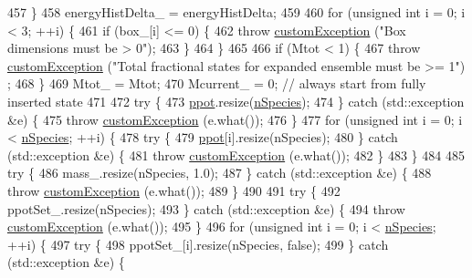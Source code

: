 \begin{DoxyCode}
457     \}
458     energyHistDelta\_ = energyHistDelta;
459 
460     \textcolor{keywordflow}{for} (\textcolor{keywordtype}{unsigned} \textcolor{keywordtype}{int} i = 0; i < 3; ++i) \{
461         \textcolor{keywordflow}{if} (box\_[i] <= 0) \{
462             \textcolor{keywordflow}{throw} \hyperlink{classcustom_exception}{customException} (\textcolor{stringliteral}{"Box dimensions must be > 0"});
463         \}
464     \}
465 
466     \textcolor{keywordflow}{if} (Mtot < 1) \{
467         \textcolor{keywordflow}{throw} \hyperlink{classcustom_exception}{customException} (\textcolor{stringliteral}{"Total fractional states for expanded ensemble must be >= 1"})
      ;
468     \}
469     Mtot\_ = Mtot;
470     Mcurrent\_ = 0; \textcolor{comment}{// always start from fully inserted state}
471 
472     \textcolor{keywordflow}{try} \{
473         \hyperlink{classsim_system_ad2e290b5963f132e6a3a56cee35c8e9f}{ppot}.resize(\hyperlink{classsim_system_ab5e2e9b6204de15520302fe1d51688dd}{nSpecies});
474     \} \textcolor{keywordflow}{catch} (std::exception &e) \{
475         \textcolor{keywordflow}{throw} \hyperlink{classcustom_exception}{customException} (e.what());
476     \}
477     \textcolor{keywordflow}{for} (\textcolor{keywordtype}{unsigned} \textcolor{keywordtype}{int} i = 0; i < \hyperlink{classsim_system_ab5e2e9b6204de15520302fe1d51688dd}{nSpecies}; ++i) \{
478         \textcolor{keywordflow}{try} \{
479             \hyperlink{classsim_system_ad2e290b5963f132e6a3a56cee35c8e9f}{ppot}[i].resize(nSpecies);
480         \} \textcolor{keywordflow}{catch} (std::exception &e) \{
481             \textcolor{keywordflow}{throw} \hyperlink{classcustom_exception}{customException} (e.what());
482         \}
483     \}
484 
485     \textcolor{keywordflow}{try} \{
486         mass\_.resize(nSpecies, 1.0);
487     \} \textcolor{keywordflow}{catch} (std::exception &e) \{
488         \textcolor{keywordflow}{throw} \hyperlink{classcustom_exception}{customException} (e.what());
489     \}
490 
491     \textcolor{keywordflow}{try} \{
492         ppotSet\_.resize(nSpecies);
493     \} \textcolor{keywordflow}{catch} (std::exception &e) \{
494         \textcolor{keywordflow}{throw} \hyperlink{classcustom_exception}{customException} (e.what());
495     \}
496     \textcolor{keywordflow}{for} (\textcolor{keywordtype}{unsigned} \textcolor{keywordtype}{int} i = 0; i < \hyperlink{classsim_system_ab5e2e9b6204de15520302fe1d51688dd}{nSpecies}; ++i) \{
497         \textcolor{keywordflow}{try} \{
498             ppotSet\_[i].resize(nSpecies, \textcolor{keyword}{false});
499         \} \textcolor{keywordflow}{catch} (std::exception &e) \{

\end{DoxyCode}
